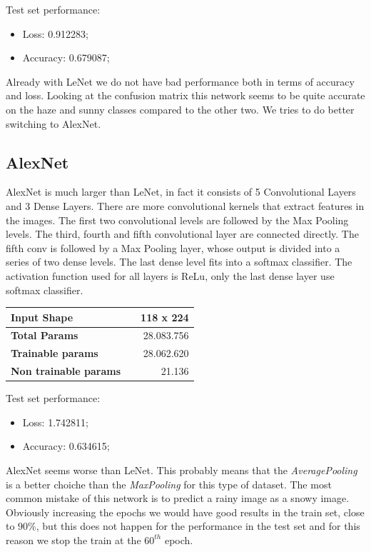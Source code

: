 \documentclass[12pt]{article}
\begin{document}
\clearpage
Test set performance:
\begin{itemize}
    \item Loss: 0.912283;
    \item Accuracy: 0.679087;
\end{itemize}
Already with LeNet we do not have bad performance both in terms of accuracy and loss. Looking at the confusion matrix this network seems to be quite accurate on the haze and sunny classes compared to the other two. We tries to do better switching to AlexNet.

\subsection{AlexNet}
AlexNet is much larger than LeNet, in fact it consists of 5 Convolutional Layers and 3 Dense Layers. There are more convolutional kernels that extract features in the images.
The first two convolutional levels are followed by the Max Pooling levels. The third, fourth and fifth convolutional layer are connected directly. The fifth conv is followed by a Max Pooling layer, whose output is divided into a series of two dense levels. The last dense level fits into a softmax classifier. The activation function used for all layers is ReLu, only the last dense layer use softmax classifier.

\bigskip
\begin{tabular}{|ll|r|}
  \hline
  {\bf Input Shape} & & 118 x 224         \\ \hline
  {\bf Total Params} & & 28.083.756       \\ \hline
  {\bf Trainable params} & & 28.062.620   \\ \hline
  {\bf Non trainable params} & & 21.136   \\ \hline
\end{tabular}

\bigskip
Test set performance:
\begin{itemize}
    \item Loss: 1.742811;
    \item Accuracy: 0.634615;
\end{itemize}

AlexNet seems worse than LeNet. This probably means that the {\em AveragePooling} is a better choiche than the {\em MaxPooling} for this type of dataset. The most common mistake of this network is to predict a rainy image as a snowy image. Obviously increasing the epochs we would have good results in the train set, close to $90\%$, but this does not happen for the performance in the test set and for this reason we stop the train at the $60^{th}$ epoch.
\end{document}
